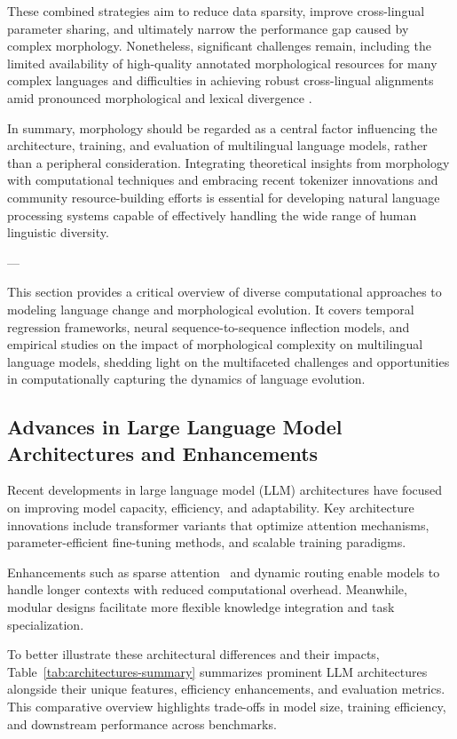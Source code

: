 \documentclass[sigconf]{acmart}
\begin{document}
These combined strategies aim to reduce data sparsity, improve cross-lingual parameter sharing, and ultimately narrow the performance gap caused by complex morphology. Nonetheless, significant challenges remain, including the limited availability of high-quality annotated morphological resources for many complex languages and difficulties in achieving robust cross-lingual alignments amid pronounced morphological and lexical divergence \cite{ref34}.

In summary, morphology should be regarded as a central factor influencing the architecture, training, and evaluation of multilingual language models, rather than a peripheral consideration. Integrating theoretical insights from morphology with computational techniques and embracing recent tokenizer innovations and community resource-building efforts is essential for developing natural language processing systems capable of effectively handling the wide range of human linguistic diversity.

---

This section provides a critical overview of diverse computational approaches to modeling language change and morphological evolution. It covers temporal regression frameworks, neural sequence-to-sequence inflection models, and empirical studies on the impact of morphological complexity on multilingual language models, shedding light on the multifaceted challenges and opportunities in computationally capturing the dynamics of language evolution.

\subsection{Advances in Large Language Model Architectures and Enhancements}

Recent developments in large language model (LLM) architectures have focused on improving model capacity, efficiency, and adaptability. Key architecture innovations include transformer variants that optimize attention mechanisms, parameter-efficient fine-tuning methods, and scalable training paradigms.

Enhancements such as sparse attention~\cite{} and dynamic routing enable models to handle longer contexts with reduced computational overhead. Meanwhile, modular designs facilitate more flexible knowledge integration and task specialization.

To better illustrate these architectural differences and their impacts, Table~\ref{tab:architectures-summary} summarizes prominent LLM architectures alongside their unique features, efficiency enhancements, and evaluation metrics. This comparative overview highlights trade-offs in model size, training efficiency, and downstream performance across benchmarks.
\end{document}
